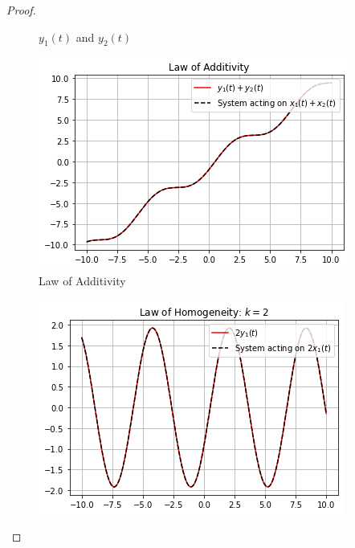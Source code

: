 \documentclass[journal,12pt,twocolumn]{IEEEtran}
\begin{document}
\begin{proof}
\begin{enumerate}
\begin{figure}[!ht]
 \caption{$y_1(t)$ and  $y_2(t)$}
 \end{figure}
 \begin{figure}[!ht]
\centering
 \includegraphics[width=\columnwidth]{graphs/law_of_additivity.png}
 \caption{Law of Additivity}
 \end{figure}
 \begin{figure}[!ht]
\centering
 \includegraphics[width=\columnwidth]{graphs/law_of_homogeneity.png}


\end{figure}
\end{enumerate}
\end{proof}
\end{document}
